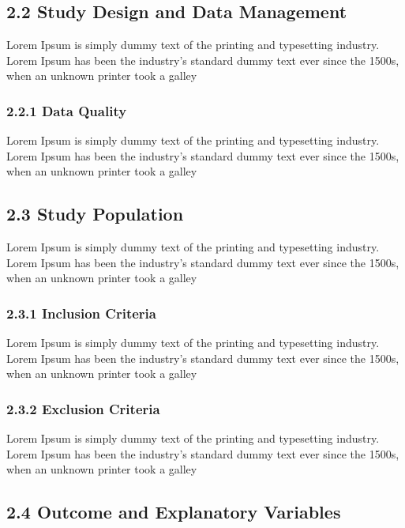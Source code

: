 \documentclass[12pt,]{article}
\begin{document}
\subsection{2.2 Study Design and Data
Management}\label{study-design-and-data-management}

Lorem Ipsum is simply dummy text of the printing and typesetting
industry. Lorem Ipsum has been the industry's standard dummy text ever
since the 1500s, when an unknown printer took a galley

\subsubsection{2.2.1 Data Quality}\label{data-quality}

Lorem Ipsum is simply dummy text of the printing and typesetting
industry. Lorem Ipsum has been the industry's standard dummy text ever
since the 1500s, when an unknown printer took a galley

\subsection{2.3 Study Population}\label{study-population}

Lorem Ipsum is simply dummy text of the printing and typesetting
industry. Lorem Ipsum has been the industry's standard dummy text ever
since the 1500s, when an unknown printer took a galley

\subsubsection{2.3.1 Inclusion Criteria}\label{inclusion-criteria}

Lorem Ipsum is simply dummy text of the printing and typesetting
industry. Lorem Ipsum has been the industry's standard dummy text ever
since the 1500s, when an unknown printer took a galley

\subsubsection{2.3.2 Exclusion Criteria}\label{exclusion-criteria}

Lorem Ipsum is simply dummy text of the printing and typesetting
industry. Lorem Ipsum has been the industry's standard dummy text ever
since the 1500s, when an unknown printer took a galley

\subsection{2.4 Outcome and Explanatory
Variables}\label{outcome-and-explanatory-variables}
\end{document}
